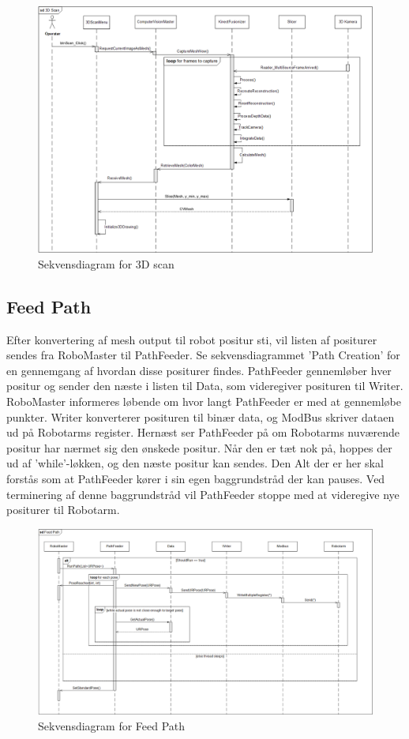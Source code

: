 \begin{figure}[H]
    \centering
    \includegraphics[width=1\textwidth]{figurer/d/Design/Sequence/sd_3Dscan}
    \caption{Sekvensdiagram for 3D scan}
    \label{sd_3Dscan}
\end{figure}
\newpage

\subsection{Feed Path}
Efter konvertering af mesh output til robot positur sti, vil listen af positurer sendes fra RoboMaster til PathFeeder. 
Se sekvensdiagrammet 'Path Creation' for en gennemgang af hvordan disse positurer findes.
PathFeeder gennemløber hver positur og sender den næste i listen til Data, som videregiver posituren til Writer.
RoboMaster informeres løbende om hvor langt PathFeeder er med at gennemløbe punkter.
Writer konverterer posituren til binær data, og ModBus skriver dataen ud på Robotarms register.
Hernæst ser PathFeeder på om Robotarms nuværende positur har nærmet sig den ønskede positur. 
Når den er tæt nok på, hoppes der ud af 'while'-løkken, og den næste positur kan sendes.
Den Alt der er her skal forstås som at PathFeeder kører i sin egen baggrundstråd der kan pauses. 
Ved terminering af denne baggrundstråd vil PathFeeder stoppe med at videregive nye positurer til Robotarm.

\begin{figure}[H]
    \centering
    \includegraphics[width=1\textwidth] {figurer/d/Design/Sequence/sd_feedpath}
    \caption{Sekvensdiagram for Feed Path}
    \label{sd_feedpath}
\end{figure}

